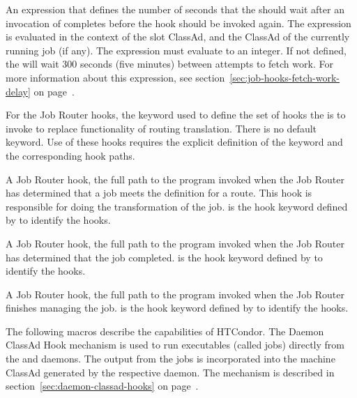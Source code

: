 \begin{description}
\label{param:FetchWorkDelay}
\item[\Macro{FetchWorkDelay}]
  An expression that defines the number of seconds that the
   should wait after an invocation of
   completes before the hook should be
  invoked again.
  The expression is evaluated in the context of the slot ClassAd, and
  the ClassAd of the currently running job (if any).
  The expression must evaluate to an integer.
  If not defined, the  will wait 300 seconds (five
  minutes) between attempts to fetch work.
  For more information about this expression, see
  section~\ref{sec:job-hooks-fetch-work-delay} on
  page~\pageref{sec:job-hooks-fetch-work-delay}.

\label{param:JobRouterHookKeyword}
\item[\Macro{JOB\_ROUTER\_HOOK\_KEYWORD}]
  For the Job Router hooks,
  the keyword used to define the set of hooks the 
  is to invoke to replace functionality of routing translation.
  There is no default keyword.
  Use of these hooks requires the explicit definition of the
  keyword and the corresponding hook paths.

\label{param:HookTranslateJob}
\item[\Macro{<Keyword>\_HOOK\_TRANSLATE\_JOB}]
  A Job Router hook,
  the full path to the program invoked when the Job Router has determined
  that a job meets the definition for a route.  
  This hook is responsible for doing the transformation of the job.
   is the hook keyword defined by
   to identify the hooks.

\label{param:HookJobFinalize}
\item[\Macro{<Keyword>\_HOOK\_JOB\_FINALIZE}]
  A Job Router hook,
  the full path to the program invoked when the Job Router has determined
  that the job completed.
   is the hook keyword defined by
   to identify the hooks.

\label{param:HookJobCleanup}
\item[\Macro{<Keyword>\_HOOK\_JOB\_CLEANUP}]
  A Job Router hook,
  the full path to the program invoked when the Job Router finishes 
  managing the job.
   is the hook keyword defined by
   to identify the hooks.

\end{description}

The following macros describe the 
capabilities of HTCondor.  
The Daemon ClassAd Hook mechanism is used to run executables (called jobs) 
directly from the  and  daemons.
The output from the jobs is incorporated into the machine ClassAd
generated by the respective daemon. 
The mechanism is described in section~\ref{sec:daemon-classad-hooks} 
on page~\pageref{sec:daemon-classad-hooks}.

